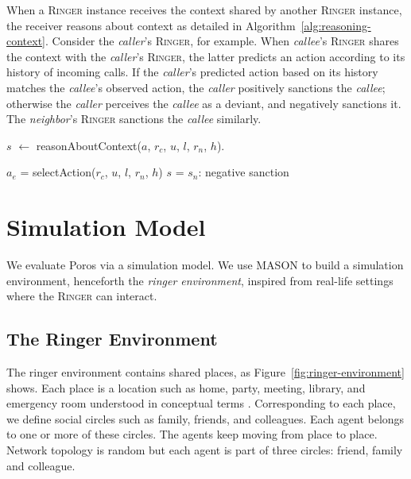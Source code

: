 \documentclass[11pt,          %
               phd,           %
               onehalfspacing %
               ]{ncsuthesis}
\newcommand{\fsc}{\textsc}
\newcommand{\fsl}{\textsl}
\newcommand{\frameworkB}{Poros\xspace}
\newcommand{\ringer}{\fsc{Ringer}\xspace}
\begin{document}
When a \ringer instance receives the context shared by another \ringer
instance, the receiver reasons about context as detailed in
Algorithm~\ref{alg:reasoning-context}. Consider the \fsl{caller}'s
\ringer, for example. When \fsl{callee}'s \ringer shares the context
with the \fsl{caller}'s \ringer, the latter predicts an action according
to its history of incoming calls. If the \fsl{caller}'s predicted action
based on its history matches the \fsl{callee}'s observed action, the
\fsl{caller} positively sanctions the \fsl{callee}; otherwise the
\fsl{caller} perceives the \fsl{callee} as a deviant, and negatively
sanctions it. The \fsl{neighbor}'s \ringer sanctions the \fsl{callee}
similarly.

\begin{algorithm}[ht]
\caption{$s$ $\leftarrow$ reasonAboutContext($a$, $r_c$, $u$, $l$, $r_n$, $h$).}
\label{alg:reasoning-context}
$a_e$ = selectAction($r_c$, $u$, $l$, $r_n$, $h$)\;
{
 $s$ = $s_n$: negative sanction\;
}
\end{algorithm}

\section{Simulation Model}
\label{sec:precious-simulation-model}

We evaluate \frameworkB via a simulation model. 
We use MASON \citep{Luke-2005-Mason} to build a simulation environment, 
henceforth the \emph{ringer environment}, inspired from real-life settings 
where the \ringer can interact.  

\subsection{The Ringer Environment}
The ringer environment contains shared places, as
Figure~\ref{fig:ringer-environment} shows. Each place is a location such
as home, party, meeting, library, and emergency room understood in
conceptual terms \citep{IC-Platys-12}. Corresponding to each place, we
define social circles such as family, friends, and colleagues. Each
agent belongs to one or more of these circles. The agents keep moving
from place to place. Network topology is random but each agent is part
of three circles: friend, family and colleague.
\end{document}
